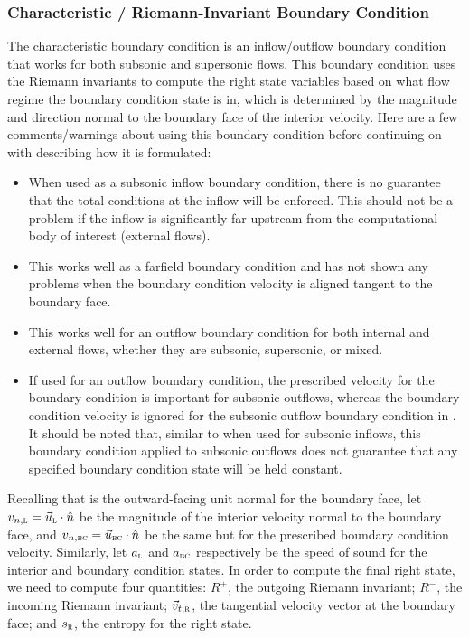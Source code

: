 \subsubsection{Characteristic \slash{} Riemann-Invariant Boundary Condition}
\label{SEC:BC:Farfield:Characteristic}

The characteristic boundary condition is an inflow\slash outflow boundary
condition that works for both subsonic and supersonic flows.
%
This boundary condition uses the Riemann invariants to compute the right state
variables based on what flow regime the boundary condition state is in, which is
determined by the magnitude and direction normal to the boundary face of the
interior velocity.
%
Here are a few comments\slash warnings about using this boundary condition
before continuing on with describing how it is formulated:
%
\begin{itemize}[itemsep=5pt,topsep=5pt,parsep=0pt]
  \item When used as a subsonic inflow boundary condition, there is no
    guarantee that the total conditions at the inflow will be enforced.
    This should not be a problem if the inflow is significantly far
    upstream from the computational body of interest (\forexample external
    flows).
  \item This works well as a farfield boundary condition and has not shown any
    problems when the boundary condition velocity is aligned tangent to the
    boundary face.
  \item This works well for an outflow boundary condition for both internal and
    external flows, whether they are subsonic, supersonic, or mixed.
  \item If used for an outflow boundary condition, the prescribed velocity for
    the boundary condition is important for subsonic outflows, whereas the
    boundary condition velocity is ignored for the subsonic outflow boundary
    condition in . It should be noted that,
    similar to when used for subsonic inflows, this boundary condition applied
    to subsonic outflows does not guarantee that any specified boundary
    condition state will be held constant.
\end{itemize}


Recalling that \normal{} is the outward-facing unit normal for the boundary
face, let $v_{n,\textsc{l}}=\vec{u}_{\textsc{l}}\cdot\hat{n}$ be the magnitude of the
interior velocity normal to the boundary face, and
$v_{n,\textsc{bc}}=\vec{u}_{\textsc{bc}}\cdot\hat{n}$ be the same but for the prescribed
boundary condition velocity.
%
Similarly, let $a_{\textsc{l}}$ and $a_{\textsc{bc}}$ respectively be the speed of sound for
the interior and boundary condition states.
%
In order to compute the final right state, we need to compute four quantities:
$R^+$, the outgoing Riemann invariant; $R^-$, the incoming Riemann invariant;
$\vec{v}_{t,\textsc{r}}$, the tangential velocity vector at the boundary
face; and $s_{\textsc{r}}$, the entropy for the right state.

